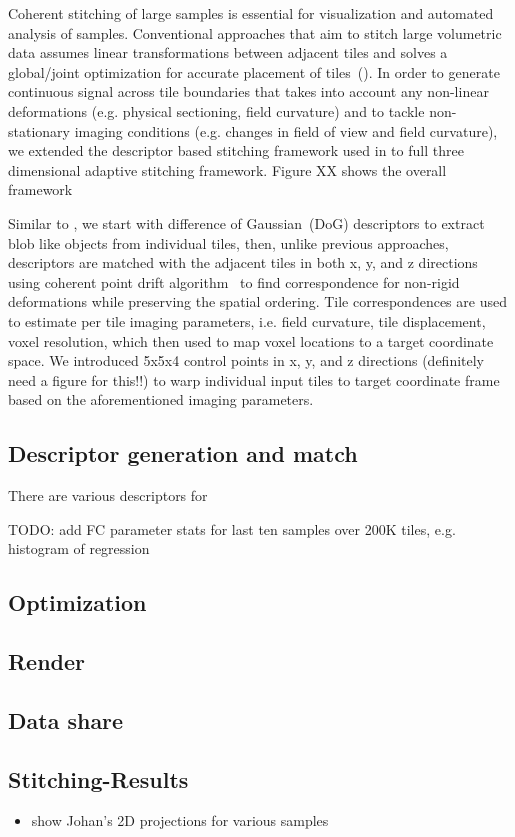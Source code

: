 \documentclass[../main.tex]{subfiles}
\begin{document}
Coherent stitching of large samples is essential for visualization and automated analysis of samples. Conventional approaches that aim to stitch large volumetric data assumes linear transformations between adjacent tiles and solves a global/joint optimization for accurate placement of tiles~(\cite{tsai2011robust, chalfoun2017mist,bria2012terastitcher,emmenlauer2009xuvtools}). In order to generate continuous signal across tile boundaries that takes into account any non-linear deformations (e.g. physical sectioning, field curvature) and to tackle non-stationary imaging conditions (e.g. changes in field of view and field curvature), we extended the descriptor based stitching framework used in \cite{economo2016platform} to full three dimensional adaptive stitching framework. Figure XX shows the overall framework


Similar to \cite{economo2016platform}, we start with difference of Gaussian~(DoG) descriptors to extract blob like objects from individual tiles, then, unlike previous approaches, descriptors are matched with the adjacent tiles in both x, y, and z directions using coherent point drift algorithm~\cite{myronenko2010point} to find correspondence for non-rigid deformations while preserving the spatial ordering. Tile correspondences are used to estimate per tile imaging parameters, i.e. field curvature, tile displacement, voxel resolution, which then used to map voxel locations to a target coordinate space. We introduced 5x5x4 control points in x, y, and z directions (definitely need a figure for this!!) to warp individual input tiles to target coordinate frame based on the aforementioned imaging parameters.

\subsection{Descriptor generation and match}
There are various descriptors for 

TODO: add FC parameter stats for last ten samples over 200K tiles, e.g. histogram of regression

\subsection{Optimization}
\subsection{Render}
\subsection{Data share}
\subsection{Stitching-Results}
\begin{itemize}
\item show Johan's 2D projections for various samples
\end{itemize}

\end{document}
